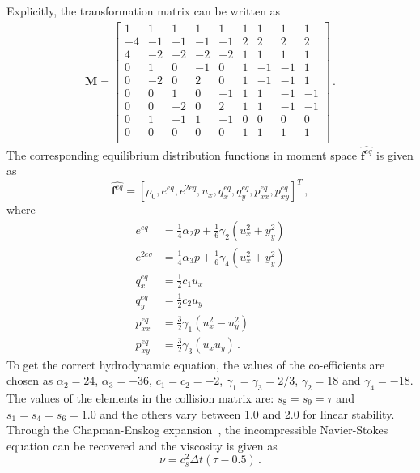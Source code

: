Explicitly, the transformation matrix can be written as
%
\begin{align}
\mathbf{M}= \begin{bmatrix}
1 &  1 &  1 &  1 &  1 &  1 &  1 &  1 &  1 \\
-4 & -1 & -1 & -1 & -1 &  2 &  2 &  2 &  2 \\ 
4 & -2 & -2 & -2 & -2 &  1 &  1 &  1 &  1 \\
0 &  1 &  0 & -1 &  0 &  1 & -1 & -1 &  1 \\
0 & -2 &  0 &  2 &  0 &  1 & -1 & -1 &  1 \\
0 &  0 &  1 &  0 & -1 &  1 &  1 & -1 & -1 \\
0 &  0 & -2 &  0 &  2 &  1 &  1 & -1 & -1 \\
0 &  1 & -1 &  1 & -1 &  0 &  0 &  0 &  0 \\
0 &  0 &  0 &  0 &  0 &  1 &  1 &  1 &  1 \\
\end{bmatrix}\,.
\end{align}
%
The corresponding equilibrium distribution functions in moment space 
$\widehat{\mathbf{f}^{eq}}$ is given as
%
\begin{equation}
\widehat{\mathbf{f}^{eq}}=\left[\rho_0,e^{eq}, 
e^{2eq},u_x,q_x^{eq},q_y^{eq},p_{xx}^{eq},p_{xy}^{eq}\right]^T\,,
\end{equation}
%
\noindent where
%
\begin{subequations}
\begin{align}
e^{eq} & = \frac{1}{4}\alpha_2p+\frac{1}{6}\gamma_2(u_x^2+y_y^2)\\
e^{2eq} & = \frac{1}{4}\alpha_3p+\frac{1}{6}\gamma_4(u_x^2+y_y^2)\\
q_x^{eq} & = \frac{1}{2}c_1u_x\\
q_y^{eq} & = \frac{1}{2}c_2u_y \\
p_{xx}^{eq} & = \frac{3}{2}\gamma_1(u_x^2 - u_y^2)\\
p_{xy}^{eq} & = \frac{3}{2}\gamma_3(u_xu_y) \,.
\end{align}
\end{subequations}
%
To get the correct hydrodynamic equation, the values of the co-efficients are 
chosen as $\alpha_2=24$,  $\alpha_3=-36$, $c_1=c_2=-2$, 
$\gamma_1=\gamma_3=2/3$, $\gamma_2=18$ and $\gamma_4=-18$. The values of the 
elements in the collision matrix are: $s_8 = s_9 = \tau$ 
and $s_1=s_4=s_6=1.0$ and the others vary between 1.0 and 2.0 for linear 
stability. Through the Chapman-Enskog expansion~\citep{Du2006}, the 
incompressible Navier-Stokes equation can be recovered and the viscosity is 
given as
%
\begin{equation}
\nu=c_s^2\Delta t(\tau-0.5)\,.
\end{equation}

